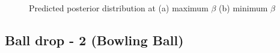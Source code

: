 \documentclass{article}
\begin{document}
\begin{figure}[H]
\begin{centering}
\,\,\,
\par\end{centering}

\caption{Predicted posterior distribution at (a) maximum $\beta$ (b) minimum
$\beta$}


\label{balldrop1t5-3-2}
\end{figure}



\subsection{Ball drop - 2 (Bowling Ball)}
\end{document}
